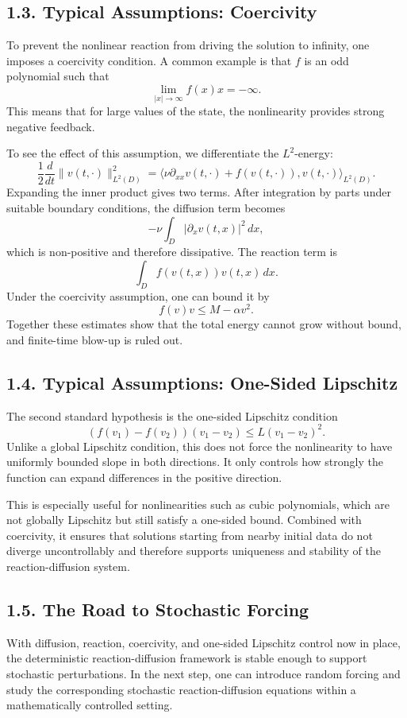 \documentclass[11pt]{article}
\theoremstyle{definition}
\theoremstyle{remark}
\begin{document}
\subsection*{1.3. Typical Assumptions: Coercivity}
To prevent the nonlinear reaction from driving the solution to infinity, one imposes a coercivity condition. A common example is that \(f\) is an odd polynomial such that
\[
\lim_{|x|\to\infty}f(x)x=-\infty.
\]
This means that for large values of the state, the nonlinearity provides strong negative feedback.

To see the effect of this assumption, we differentiate the \(L^2\)-energy:
\[
\frac12\frac{d}{dt}\|v(t,\cdot)\|_{L^2(D)}^2
=
\langle \nu\partial_{xx}v(t,\cdot)+f(v(t,\cdot)),v(t,\cdot)\rangle_{L^2(D)}.
\]
Expanding the inner product gives two terms. After integration by parts under suitable boundary conditions, the diffusion term becomes
\[
-\nu\int_D |\partial_x v(t,x)|^2\,dx,
\]
which is non-positive and therefore dissipative. The reaction term is
\[
\int_D f(v(t,x))v(t,x)\,dx.
\]
Under the coercivity assumption, one can bound it by
\[
f(v)v\le M-\alpha v^2.
\]
Together these estimates show that the total energy cannot grow without bound, and finite-time blow-up is ruled out.

\subsection*{1.4. Typical Assumptions: One-Sided Lipschitz}
The second standard hypothesis is the one-sided Lipschitz condition
\[
(f(v_1)-f(v_2))(v_1-v_2)\le L(v_1-v_2)^2.
\]
Unlike a global Lipschitz condition, this does not force the nonlinearity to have uniformly bounded slope in both directions. It only controls how strongly the function can expand differences in the positive direction.

This is especially useful for nonlinearities such as cubic polynomials, which are not globally Lipschitz but still satisfy a one-sided bound. Combined with coercivity, it ensures that solutions starting from nearby initial data do not diverge uncontrollably and therefore supports uniqueness and stability of the reaction-diffusion system.

\subsection*{1.5. The Road to Stochastic Forcing}
With diffusion, reaction, coercivity, and one-sided Lipschitz control now in place, the deterministic reaction-diffusion framework is stable enough to support stochastic perturbations. In the next step, one can introduce random forcing and study the corresponding stochastic reaction-diffusion equations within a mathematically controlled setting.
\end{document}
